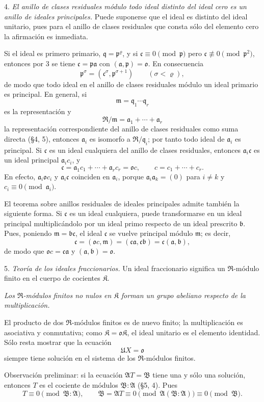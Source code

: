\documentclass[11pt]{article}
\providecommand{\mR}{\mathfrak{R}}
\providecommand{\mK}{\mathfrak{K}}
\providecommand{\ma}{\mathfrak{a}}
\providecommand{\mb}{\mathfrak{b}}
\providecommand{\mc}{\mathfrak{c}}
\providecommand{\mm}{\mathfrak{m}}
\providecommand{\mo}{\mathfrak{o}}
\providecommand{\mpideal}{\mathfrak{p}}
\providecommand{\mq}{\mathfrak{q}}
\begin{document}
4. \emph{El anillo de clases residuales módulo todo ideal distinto del ideal cero es un anillo de ideales principales.} Puede suponerse que el ideal es distinto del ideal unitario, pues para el anillo de clases residuales que consta sólo del elemento cero la afirmación es inmediata.

Si el ideal es primero primario, $\mq=\mpideal^\varrho$, y si $\mc\equiv0\pmod{\mpideal}$ pero $\mc\not\equiv0\pmod{\mpideal^2}$, entonces por 3 se tiene $\mc=\mpideal\ma$ con $(\ma,\mpideal)=\mo$. En consecuencia
\[
        \mpideal^\sigma=(\mc^\sigma,\mpideal^{\sigma+1})
        \qquad(\sigma<\varrho),
\]
de modo que todo ideal en el anillo de clases residuales módulo un ideal primario es principal. En general, si
\[
        \mm=\mq_1\cdots\mq_r
\]
es la representación y
\[
        \mR/\mm=\ma_1+\cdots+\ma_r
\]
la representación correspondiente del anillo de clases residuales como suma directa (§4, 5), entonces $\ma_i$ es isomorfo a $\mR/\mq_i$; por tanto todo ideal de $\ma_i$ es principal. Si $\mc$ es un ideal cualquiera del anillo de clases residuales, entonces $\ma_i\mc$ es un ideal principal $\ma_i c_i$, y
\[
        \mc=\ma_1c_1+\cdots+\ma_r c_r=\mo c,
        \qquad c=c_1+\cdots+c_r.
\]
En efecto, $\ma_i\mo c_i$ y $\ma_i\mc$ coinciden en $\ma_i$, porque $\ma_i\ma_k=(0)$ para $i\ne k$ y $c_i\equiv0\pmod{\ma_i}$.

El teorema sobre anillos residuales de ideales principales admite también la siguiente forma. Si $\mc$ es un ideal cualquiera, puede transformarse en un ideal principal multiplicándolo por un ideal primo respecto de un ideal prescrito $\mb$. Pues, poniendo $\mm=\mb\mc$, el ideal $\mc$ se vuelve principal módulo $\mm$; es decir,
\[
        \mc=(\mo c,\mm)=(\mc\ma,\mc\mb)=\mc(\ma,\mb),
\]
de modo que $\mo c=\mc\ma$ y $(\ma,\mb)=\mo$.

5. \emph{Teoría de los ideales fraccionarios.} Un ideal fraccionario significa un $\mR$-módulo finito en el cuerpo de cocientes $\mK$.

\emph{Los $\mR$-módulos finitos no nulos en $\mK$ forman un grupo abeliano respecto de la multiplicación.}

El producto de dos $\mR$-módulos finitos es de nuevo finito; la multiplicación es asociativa y conmutativa; como $\mK=\mo\mK$, el ideal unitario es el elemento identidad. Sólo resta mostrar que la ecuación
\[
        \mathfrak U X=\mo
\]
siempre tiene solución en el sistema de los $\mR$-módulos finitos.

Observación preliminar: si la ecuación $\mathfrak A T=\mathfrak B$ tiene una y sólo una solución, entonces $T$ es el cociente de módulos $\mathfrak B:\mathfrak A$ (§5, 4). Pues
\[
        T\equiv0\pmod{\mathfrak B:\mathfrak A},
        \qquad
        \mathfrak B=\mathfrak A T\equiv0\pmod{\mathfrak A(\mathfrak B:\mathfrak A)}\equiv0\pmod{\mathfrak B}.
\]
\end{document}

